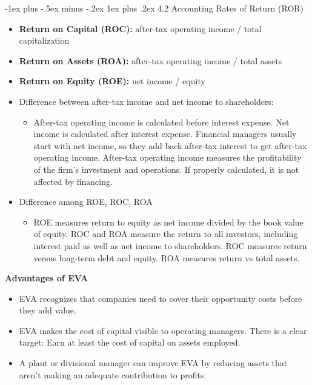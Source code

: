 \documentclass[10pt,landscape]{article}
\makeatletter
\newcommand{\subsubsubsection}{\@startsection{subsubsection}{3}{0mm}%
                                {-1ex plus -.5ex minus -.2ex}%
                                {1ex plus .2ex}%
                                {\normalfont\scriptsize\bfseries}}
\makeatother
\begin{document}
\begin{multicols*}{3}
\subsubsubsection{4.2 Accounting Rates of Return (ROR)}
\begin{itemize}[topsep=0pt,noitemsep,wide=0pt, leftmargin=\dimexpr{} + 2\relax]
    \item \textbf{Return on Capital (ROC):} after-tax operating income / total capitalization
    \item \textbf{Return on Assets (ROA):} after-tax operating income / total assets
    \item \textbf{Return on Equity (ROE):} net income / equity
    \item Difference between after-tax income and net income to shareholders:
    \begin{itemize}[topsep=0pt,noitemsep,wide=0pt, leftmargin=\dimexpr{} + 2\relax]
        \item After-tax operating income is calculated before interest expense. Net income is
        calculated after interest expense. Financial managers usually start with net income,
        so they add back after-tax interest to get after-tax operating income. After-tax
        operating income measures the profitability of the firm’s investment and operations.
        If properly calculated, it is not affected by financing.
    \end{itemize}
    \item Difference among ROE, ROC, ROA
    \begin{itemize}[topsep=0pt,noitemsep,wide=0pt, leftmargin=\dimexpr{} + 2\relax]
        \item ROE measures return to equity as net income divided by the book value of equity.
        ROC and ROA measure the return to all investors, including interest paid as well as
        net income to shareholders. ROC measures return versus long-term debt and
        equity. ROA measures return vs total assets.
    \end{itemize}
\end{itemize}
\textbf{Advantages of EVA}
\begin{itemize}[topsep=0pt,noitemsep,wide=0pt, leftmargin=\dimexpr{} + 2\relax]
    \item EVA recognizes that companies need to cover their opportunity costs before they add value.
    \item EVA makes the cost of capital visible to operating managers. There is a clear target: Earn at least the cost of capital on assets employed.
    \item A plant or divisional manager can improve EVA by reducing assets that aren’t making an adequate contribution to profits.
\end{itemize}


\end{multicols*}
\end{document}
